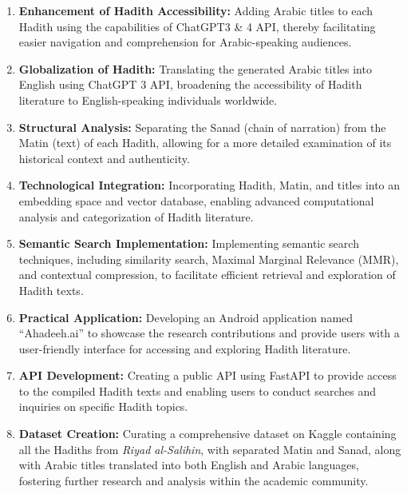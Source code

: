 \begin{enumerate}
    \item \textbf{Enhancement of Hadith Accessibility:} Adding Arabic titles to each Hadith using the capabilities of ChatGPT3 \& 4 API, thereby facilitating easier navigation and comprehension for Arabic-speaking audiences.
    
    \item \textbf{Globalization of Hadith:} Translating the generated Arabic titles into English using ChatGPT 3 API, broadening the accessibility of Hadith literature to English-speaking individuals worldwide.
    
    \item \textbf{Structural Analysis:} Separating the Sanad (chain of narration) from the Matin (text) of each Hadith, allowing for a more detailed examination of its historical context and authenticity.
    
    \item \textbf{Technological Integration:} Incorporating Hadith, Matin, and titles into an embedding space and vector database, enabling advanced computational analysis and categorization of Hadith literature.
    
    \item \textbf{Semantic Search Implementation:} Implementing semantic search techniques, including similarity search, Maximal Marginal Relevance (MMR), and contextual compression, to facilitate efficient retrieval and exploration of Hadith texts.
    
    \item \textbf{Practical Application:} Developing an Android application named ``Ahadeeh.ai'' to showcase the research contributions and provide users with a user-friendly interface for accessing and exploring Hadith literature.
    
    \item \textbf{API Development:} Creating a public API using FastAPI to provide access to the compiled Hadith texts and enabling users to conduct searches and inquiries on specific Hadith topics.
    
    \item \textbf{Dataset Creation:} Curating a comprehensive dataset on Kaggle containing all the Hadiths from \textit{Riyad al-Salihin}, with separated Matin and Sanad, along with Arabic titles translated into both English and Arabic languages, fostering further research and analysis within the academic community.
\end{enumerate}

